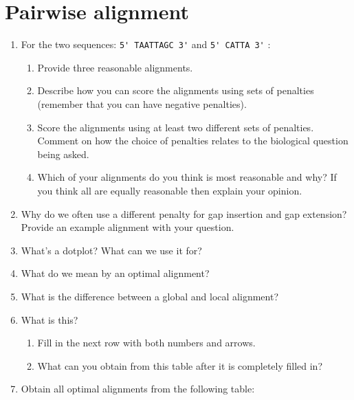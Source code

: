 \documentclass[11pt]{article}
\begin{document}
\section{Pairwise alignment}
\begin{enumerate}
\item For the two sequences: \verb|5' TAATTAGC 3'| and \verb|5' CATTA 3'| :
  \begin{enumerate}
    \item Provide three reasonable alignments.
    \item Describe how you can score the alignments using sets of penalties
      (remember that you can have negative penalties).
    \item Score the alignments using at least two different sets of
      penalties. Comment on how the choice of penalties relates to the
      biological question being asked.
    \item Which of your alignments do you think is most reasonable and why? If you
      think all are equally reasonable then explain your opinion.
  \end{enumerate}
\item Why do we often use a different penalty for gap insertion and gap
  extension? Provide an example alignment with your question.
\item What's a dotplot? What can we use it for?
\item What do we mean by an optimal alignment?
\item What is the difference between a global and local alignment?
\item What is this?
  \begin{figure}[H]
    \begin{tikzpicture}[scale=0.6]
      
    \end{tikzpicture}
  \end{figure}
  \begin{enumerate}
  \item Fill in the next row with both numbers and arrows.
  \item What can you obtain from this table after it is completely filled in?
  \end{enumerate}
\item Obtain all optimal alignments from the following table:
  \begin{figure}[H]
    \begin{tikzpicture}[scale=0.6]
      
    \end{tikzpicture}

\end{figure}
\end{enumerate}
\end{document}
